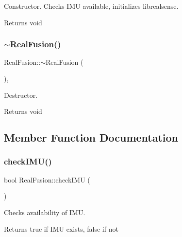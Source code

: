 Constructor. Checks I\+MU available, initializes librealsense. 

\begin{DoxyReturn}{Returns}
void 
\end{DoxyReturn}
\mbox{\label{classRealFusion_a2b1dd81581a3b922da3d8231d71524ce}} 
\subsubsection{\texorpdfstring{$\sim$\+Real\+Fusion()}{~RealFusion()}}
{\footnotesize\ttfamily Real\+Fusion\+::$\sim$\+Real\+Fusion (\begin{DoxyParamCaption}{ }\end{DoxyParamCaption})\hspace{0.3cm}{\ttfamily [inline]}, {\ttfamily [virtual]}}



Destructor. 

\begin{DoxyReturn}{Returns}
void 
\end{DoxyReturn}


\subsection{Member Function Documentation}
\mbox{\label{classRealFusion_a77329f8bfa4390754ddb1c72b58281ff}} 
\subsubsection{\texorpdfstring{check\+I\+M\+U()}{checkIMU()}}
{\footnotesize\ttfamily bool Real\+Fusion\+::check\+I\+MU (\begin{DoxyParamCaption}{ }\end{DoxyParamCaption})}



Checks availability of I\+MU. 

\begin{DoxyReturn}{Returns}
true if I\+MU exists, false if not 
\end{DoxyReturn}
\mbox{\label{classRealFusion_a0fa5b36d1b32622ec65c41e2c3852c2f}} 
